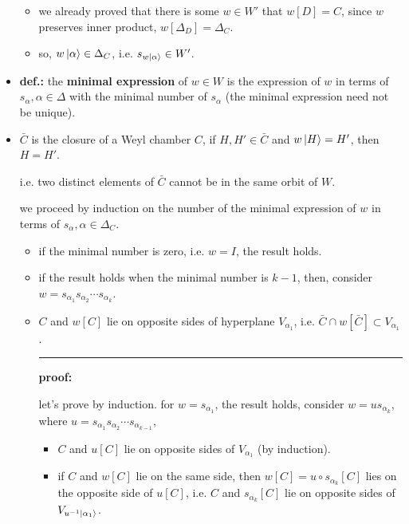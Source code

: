 \begin{itemize}
\begin{tcolorbox}[title=proof:]
\begin{itemize}
			\item we already proved that there is some $w \in W'$ that $w[D] = C$, since $w$ preserves inner product, $w[\Delta_D] = \Delta_C$.
			
			\item so, $w \ket{\alpha} \in \Delta_C$, i.e. $s_{w \ket{\alpha}} \in W'$.
		\end{itemize}
	\end{tcolorbox}
	
	\item \textbf{def.:} the \textbf{minimal expression} of $w \in W$ is the expression of $w$ in terms of $s_\alpha, \alpha \in \Delta$ with the minimal number of $s_\alpha$ (the minimal expression need not be unique).
	
	\item $\bar{C}$ is the closure of a Weyl chamber $C$, if $H, H' \in \bar{C}$ and $w \ket{H} = H'$, then $H = H'$.
	
	i.e. two distinct elements of $\bar{C}$ cannot be in the same orbit of $W$.
	
	\begin{tcolorbox}[title=proof:]
		we proceed by induction on the number of the minimal expression of $w$ in terms of $s_\alpha, \alpha \in \Delta_C$.
		\begin{itemize}
			\item if the minimal number is zero, i.e. $w = I$, the result holds.
			
			\item if the result holds when the minimal number is $k - 1$, then, consider $w = s_{\alpha_1} s_{\alpha_2} \cdots s_{\alpha_k}$.
			
			\item $C$ and $w[C]$ lie on opposite sides of hyperplane $V_{\alpha_1}$, i.e. $\bar{C} \cap w[\bar{C}] \subset V_{\alpha_1}$.
			
			\noindent\rule[0.5ex]{\linewidth}{0.5pt} %
			
			\textbf{proof:}
			
			let's prove by induction. for $w = s_{\alpha_1}$, the result holds, consider $w = u s_{\alpha_k}$, where $u = s_{\alpha_1} s_{\alpha_2} \cdots s_{\alpha_{k - 1}}$,
			\begin{itemize}
				\item $C$ and $u[C]$ lie on opposite sides of $V_{\alpha_1}$ (by induction).
				
				\item if $C$ and $w[C]$ lie on the same side, then $w[C] = u \circ s_{\alpha_k}[C]$ lies on the opposite side of $u[C]$, i.e. $C$ and $s_{\alpha_k}[C]$ lie on opposite sides of $V_{u^{- 1} \ket{\alpha_1}}$.
				

\end{itemize}
\end{itemize}
\end{tcolorbox}
\end{itemize}
